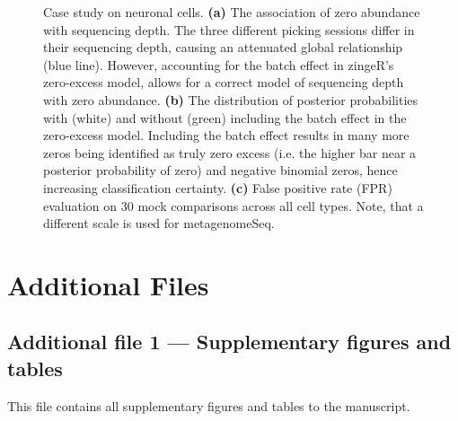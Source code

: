 \documentclass{bmcart}
\begin{document}
\begin{backmatter}
\begin{figure}[h!]
	\center
	\caption{Case study on neuronal cells. \textbf{(a)} The association of zero abundance with sequencing depth. The three different picking sessions differ in their sequencing depth, causing an attenuated global relationship (blue line). However, accounting for the batch effect in zingeR's zero-excess model, allows for a correct model of sequencing depth with zero abundance. 
	\textbf{(b)} The distribution of posterior probabilities with (white) and without (green) including the batch effect in the zero-excess model. Including the batch effect results in many more zeros being identified as truly zero excess (i.e. the higher bar near a posterior probability of zero) and negative binomial zeros, hence increasing classification certainty.
	\textbf{(c)} False positive rate (FPR) evaluation on $30$ mock comparisons across all cell types. Note, that a different scale is used for metagenomeSeq.}
	\label{fig:usoskin}
\end{figure}






\section*{Additional Files}
  \subsection*{Additional file 1 --- Supplementary figures and tables}
This file contains all supplementary figures and tables to the manuscript.

\end{backmatter}
\end{document}
